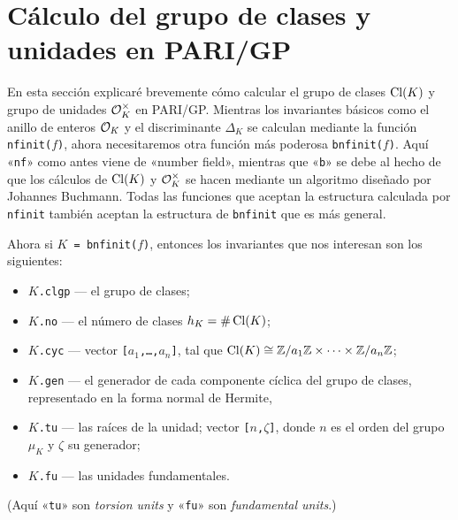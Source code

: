 
\section{Cálculo del grupo de clases y unidades en PARI/GP}

En esta sección explicaré brevemente cómo calcular el grupo de clases $\operatorname{Cl} (K)$
y grupo de unidades $\mathcal{O}_K^\times$ en PARI/GP. Mientras los invariantes básicos
como el anillo de enteros $\mathcal{O}_K$ y el discriminante $\Delta_K$ se calculan
mediante la función \texttt{nfinit($f$)}, ahora necesitaremos otra función más
poderosa \texttt{bnfinit($f$)}. Aquí «\texttt{nf}» como antes viene de
«number field», mientras que «\texttt{b}» se debe al hecho de que los cálculos
de $\operatorname{Cl} (K)$ y $\mathcal{O}_K^\times$ se hacen mediante un algoritmo diseñado por
Johannes Buchmann. Todas las funciones que aceptan la estructura calculada por
\texttt{nfinit} también aceptan la estructura de \texttt{bnfinit} que es
más general.

Ahora si \texttt{$K$ = bnfinit($f$)}, entonces los invariantes que nos interesan
son los siguientes:
\begin{itemize}
\item \texttt{$K$.clgp} --- el grupo de clases;
\item \texttt{$K$.no} --- el número de clases $h_K = \# \operatorname{Cl} (K)$;
\item \texttt{$K$.cyc} --- vector \texttt{[$a_1$,\ldots,$a_n$]}, tal que
  $\operatorname{Cl} (K) \cong \mathbb{Z}/a_1\mathbb{Z} \times \cdots \times \mathbb{Z}/a_n\mathbb{Z}$;
\item \texttt{$K$.gen} --- el generador de cada componente cíclica del
  grupo de clases, representado en la forma normal de Hermite,
\item \texttt{$K$.tu} --- las raíces de la unidad; vector
  \texttt{[$n$,$\zeta$]}, donde $n$ es el orden del grupo $\mu_K$ y $\zeta$
  su generador;
\item \texttt{$K$.fu} --- las unidades fundamentales.
\end{itemize}
(Aquí «\texttt{tu}» son \emph{torsion units} y «\texttt{fu}» son
\emph{fundamental units}.)


